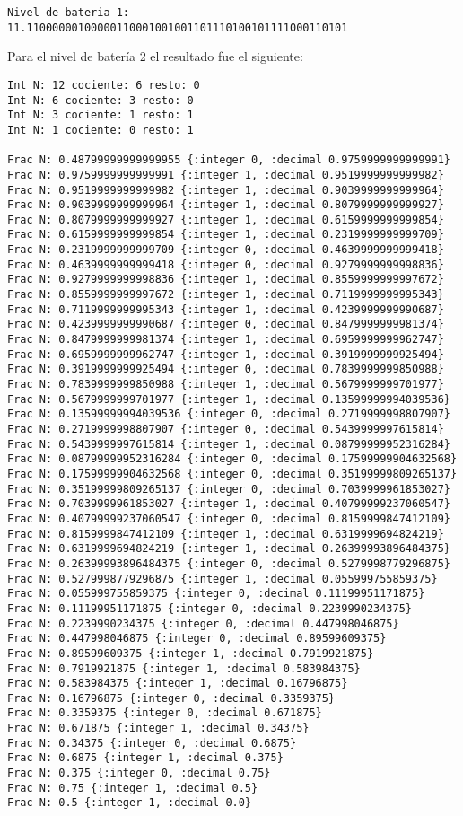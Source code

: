 \documentclass[stu, 12pt, letterpaper, donotrepeattitle, floatsintext, natbib]{apa7}
\begin{document}
\begin{verbatim}
Nivel de bateria 1: 11.11000000100000110001001001101110100101111000110101
\end{verbatim}

Para el nivel de batería 2 el resultado fue el siguiente:

\begin{verbatim}
Int N: 12 cociente: 6 resto: 0
Int N: 6 cociente: 3 resto: 0
Int N: 3 cociente: 1 resto: 1
Int N: 1 cociente: 0 resto: 1

Frac N: 0.48799999999999955 {:integer 0, :decimal 0.9759999999999991}
Frac N: 0.9759999999999991 {:integer 1, :decimal 0.9519999999999982}
Frac N: 0.9519999999999982 {:integer 1, :decimal 0.9039999999999964}
Frac N: 0.9039999999999964 {:integer 1, :decimal 0.8079999999999927}
Frac N: 0.8079999999999927 {:integer 1, :decimal 0.6159999999999854}
Frac N: 0.6159999999999854 {:integer 1, :decimal 0.2319999999999709}
Frac N: 0.2319999999999709 {:integer 0, :decimal 0.4639999999999418}
Frac N: 0.4639999999999418 {:integer 0, :decimal 0.9279999999998836}
Frac N: 0.9279999999998836 {:integer 1, :decimal 0.8559999999997672}
Frac N: 0.8559999999997672 {:integer 1, :decimal 0.7119999999995343}
Frac N: 0.7119999999995343 {:integer 1, :decimal 0.4239999999990687}
Frac N: 0.4239999999990687 {:integer 0, :decimal 0.8479999999981374}
Frac N: 0.8479999999981374 {:integer 1, :decimal 0.6959999999962747}
Frac N: 0.6959999999962747 {:integer 1, :decimal 0.3919999999925494}
Frac N: 0.3919999999925494 {:integer 0, :decimal 0.7839999999850988}
Frac N: 0.7839999999850988 {:integer 1, :decimal 0.5679999999701977}
Frac N: 0.5679999999701977 {:integer 1, :decimal 0.13599999994039536}
Frac N: 0.13599999994039536 {:integer 0, :decimal 0.2719999998807907}
Frac N: 0.2719999998807907 {:integer 0, :decimal 0.5439999997615814}
Frac N: 0.5439999997615814 {:integer 1, :decimal 0.08799999952316284}
Frac N: 0.08799999952316284 {:integer 0, :decimal 0.17599999904632568}
Frac N: 0.17599999904632568 {:integer 0, :decimal 0.35199999809265137}
Frac N: 0.35199999809265137 {:integer 0, :decimal 0.7039999961853027}
Frac N: 0.7039999961853027 {:integer 1, :decimal 0.40799999237060547}
Frac N: 0.40799999237060547 {:integer 0, :decimal 0.8159999847412109}
Frac N: 0.8159999847412109 {:integer 1, :decimal 0.6319999694824219}
Frac N: 0.6319999694824219 {:integer 1, :decimal 0.26399993896484375}
Frac N: 0.26399993896484375 {:integer 0, :decimal 0.5279998779296875}
Frac N: 0.5279998779296875 {:integer 1, :decimal 0.055999755859375}
Frac N: 0.055999755859375 {:integer 0, :decimal 0.11199951171875}
Frac N: 0.11199951171875 {:integer 0, :decimal 0.2239990234375}
Frac N: 0.2239990234375 {:integer 0, :decimal 0.447998046875}
Frac N: 0.447998046875 {:integer 0, :decimal 0.89599609375}
Frac N: 0.89599609375 {:integer 1, :decimal 0.7919921875}
Frac N: 0.7919921875 {:integer 1, :decimal 0.583984375}
Frac N: 0.583984375 {:integer 1, :decimal 0.16796875}
Frac N: 0.16796875 {:integer 0, :decimal 0.3359375}
Frac N: 0.3359375 {:integer 0, :decimal 0.671875}
Frac N: 0.671875 {:integer 1, :decimal 0.34375}
Frac N: 0.34375 {:integer 0, :decimal 0.6875}
Frac N: 0.6875 {:integer 1, :decimal 0.375}
Frac N: 0.375 {:integer 0, :decimal 0.75}
Frac N: 0.75 {:integer 1, :decimal 0.5}
Frac N: 0.5 {:integer 1, :decimal 0.0}


\end{verbatim}
\end{document}
